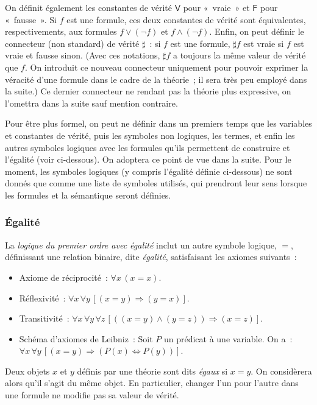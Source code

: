 On définit également les constantes de vérité $\mathsf{V}$ pour « vraie » et $\mathsf{F}$ pour « fausse ». 
Si $f$ est une formule, ces deux constantes de vérité sont équivalentes, respectivements, aux formules $f \vee (\neg f)$ et $f \wedge (\neg f)$. 
Enfin, on peut définir le connecteur (non standard) de vérité $\sharp$ : si $f$ est une formule, $\sharp f$ est vraie si $f$ est vraie et fausse sinon. 
(Avec ces notations, $\sharp f$ a toujours la même valeur de vérité que $f$. 
On introduit ce nouveau connecteur uniquement pour pouvoir exprimer la véracité d'une formule dans le cadre de la théorie ; il sera très peu employé dans la suite.)
Ce dernier connecteur ne rendant pas la théorie plus expressive, on l'omettra dans la suite sauf mention contraire.

Pour être plus formel, on peut ne définir dans un premiers temps que les variables et constantes de vérité, puis les symboles non logiques, les termes, et enfin les autres symboles logiques avec les formules qu'ils permettent de construire et l'égalité (voir ci-dessous). 
On adoptera ce point de vue dans la suite. 
Pour le moment, les symboles logiques (y compris l'égalité définie ci-dessous) ne sont donnés que comme une liste de symboles utilisés, qui prendront leur sens lorsque les formules et la sémantique seront définies.

\subsubsection{Égalité} 

La \textit{logique du premier ordre avec égalité} inclut un autre symbole logique, $=$, définissant une relation binaire, dite \textit{égalité}, satisfaisant les axiomes suivants : 
\begin{itemize}
    \item Axiome de réciprocité : $\forall x \, (x = x)$. 
    \item Réflexivité : $\forall x \, \forall y \, [ (x=y) \Rightarrow (y=x) ]$.
    \item Transitivité : $\forall x \, \forall y \, \forall z \, [((x=y) \wedge (y=z)) \Rightarrow (x=z)]$.
    \item Schéma d'axiomes de Leibniz : Soit $P$ un prédicat à une variable. On a : $\forall x \, \forall y \, [ (x = y) \Rightarrow (P(x) \Leftrightarrow P(y))]$.
\end{itemize}

Deux objets $x$ et $y$ définis par une théorie sont dits \textit{égaux} si $x = y$. 
On considèrera alors qu'il s'agit du même objet. 
En particulier, changer l'un pour l'autre dans une formule ne modifie pas sa valeur de vérité.

